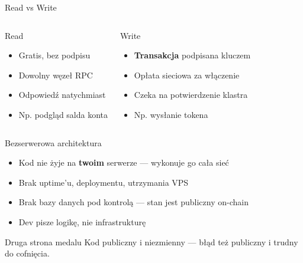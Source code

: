 \begin{frame}{Read vs Write}
  \begin{columns}
      \begin{block}{Read}
        \begin{itemize}
          \item Gratis, bez podpisu
          \item Dowolny węzeł RPC
          \item Odpowiedź natychmiast
          \item Np. podgląd salda konta
        \end{itemize}
      \end{block}

      \begin{alertblock}{Write}
        \begin{itemize}
          \item \textbf{Transakcja} podpisana kluczem
          \item Opłata sieciowa za włączenie
          \item Czeka na potwierdzenie klastra
          \item Np. wysłanie tokena
        \end{itemize}
      \end{alertblock}
  \end{columns}
\end{frame}

\begin{frame}{Bezserwerowa architektura}
  \begin{itemize}
    \item Kod nie żyje na \textbf{twoim} serwerze --- wykonuje go cała sieć
    \item Brak uptime'u, deploymentu, utrzymania VPS
    \item Brak bazy danych pod kontrolą --- stan jest publiczny on-chain
    \item Dev pisze logikę, nie infrastrukturę
  \end{itemize}
  \vspace{0.3cm}
  \begin{alertblock}{Druga strona medalu}
    Kod publiczny i niezmienny --- błąd też publiczny i trudny do cofnięcia.
  \end{alertblock}
\end{frame}


